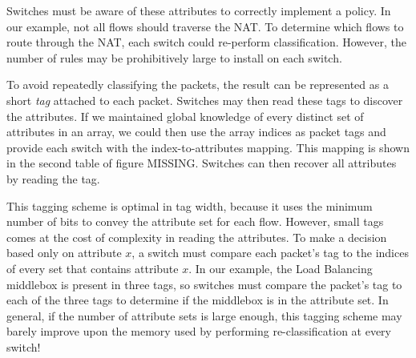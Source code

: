 Switches must be aware of these attributes to correctly implement a policy. In our example, not all flows should traverse the NAT. To determine which flows to route through the NAT, each switch could re-perform classification. However, the number of rules may be prohibitively large to install on each switch.  

To avoid repeatedly classifying the packets, the result can be represented as a short \textit{tag} attached
to each packet. Switches may then read these tags to discover the attributes. If we maintained global knowledge of every distinct set of attributes in an array, we could then use the array indices as packet tags and provide each switch with the index-to-attributes mapping. This mapping is shown in the second table of figure MISSING. Switches can then recover all attributes by reading the tag.


This tagging scheme is optimal in tag width, because it uses the minimum number of bits to convey the attribute set for each flow. However, small tags comes at the cost of complexity in reading the attributes.  To make a decision based only on attribute $x$, a switch must compare each packet's tag to the indices of every set that contains attribute $x$. In our example, the Load Balancing middlebox is present in three tags, so switches must compare the packet's tag to each of the three tags to determine if the middlebox is in the attribute set. In general, if the number of attribute sets is large enough, this tagging scheme may barely improve upon the memory used by performing re-classification at every switch!







